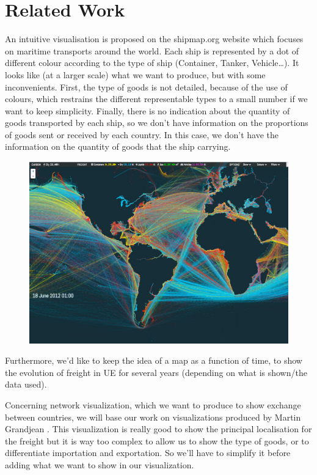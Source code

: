 \documentclass{vgtc}
\begin{document}
\section{Related Work}
An intuitive visualisation is proposed on the shipmap.org website \cite{shipmap} which focuses on maritime transports around the world. Each ship is represented by a dot of different colour according to the type of ship (Container, Tanker, Vehicle…). It looks like (at a larger scale) what we want to produce, but with some inconvenients. First, the type of goods is not detailed, because of the use of colours, which restrains the different representable types to a small number if we want to keep simplicity. Finally, there is no indication about the quantity of goods transported by each ship, so we don’t have information on the proportions of goods sent or received by each country. In this case, we don’t have the information on the quantity of goods that the ship carrying.

\begin{figure}[H]
\center
\includegraphics[scale=0.2]{shipmap.jpg}
\end{figure}

Furthermore, we’d like to keep the idea of a map as a function of time, to show the evolution of freight in UE for several years (depending on what is shown/the data used). 

Concerning network visualization, which we want to produce to show exchange between countries, we will base our work on visualizations produced by Martin Grandjean \cite{airtraffic}. This visualization is really good to show the principal localisation for the freight but it is way too complex to allow us to show the type of goods, or to differentiate importation and exportation. So we’ll have to simplify it before adding what we want to show in our visualization.
\end{document}
